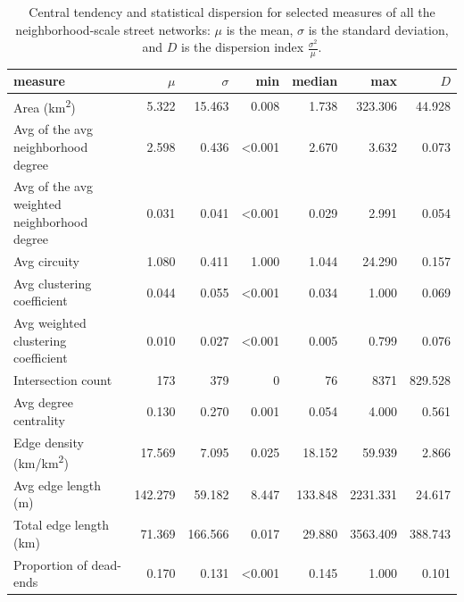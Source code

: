 \documentclass[11pt]{article}
\begin{document}
\begin{multicols}{2}
\begin{table}[htbp]
\centering
\caption{Central tendency and statistical dispersion for selected measures of all the neighborhood-scale street networks: $\mu$ is the mean, $\sigma$ is the standard deviation, and $D$ is the dispersion index $\frac{\sigma ^ 2}{\mu}$.}
\label{tab:measures_neighborhoods}
\small
\begin{tabular}{ l r r r r r r }
	\toprule
	measure                                          & $\mu$   & $\sigma$& min            & median         & max      & $D$     \\
	\midrule
	Area (km\textsuperscript{2})                     & 5.322   & 15.463  & 0.008          & 1.738          & 323.306  & 44.928  \\
	Avg of the avg neighborhood degree               & 2.598   & 0.436   & \textless0.001 & 2.670          & 3.632    & 0.073   \\
	Avg of the avg weighted neighborhood degree      & 0.031   & 0.041   & \textless0.001 & 0.029          & 2.991    & 0.054   \\
	Avg circuity                                     & 1.080   & 0.411   & 1.000          & 1.044          & 24.290   & 0.157   \\
	Avg clustering coefficient                       & 0.044   & 0.055   & \textless0.001 & 0.034          & 1.000    & 0.069   \\
	Avg weighted clustering coefficient              & 0.010   & 0.027   & \textless0.001 & 0.005          & 0.799    & 0.076   \\
	Intersection count                               & 173     & 379     & 0              & 76             & 8371     & 829.528 \\
	Avg degree centrality                            & 0.130   & 0.270   & 0.001          & 0.054          & 4.000    & 0.561   \\
	Edge density (km/km\textsuperscript{2})          & 17.569  & 7.095   & 0.025          & 18.152         & 59.939   & 2.866   \\
	Avg edge length (m)                              & 142.279 & 59.182  & 8.447          & 133.848        & 2231.331 & 24.617  \\
	Total edge length (km)                           & 71.369  & 166.566 & 0.017          & 29.880         & 3563.409 & 388.743 \\
	Proportion of dead-ends                          & 0.170   & 0.131   & \textless0.001 & 0.145          & 1.000    & 0.101   \\

\end{tabular}
\end{table}
\end{multicols}
\end{document}
